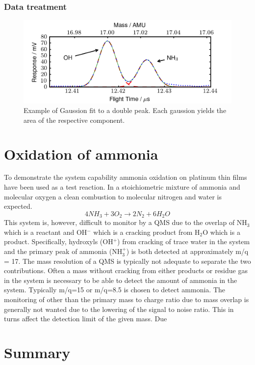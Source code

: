 \documentclass[aip,rsi]{revtex4-1}
\begin{document}
\subsubsection{Data treatment}
\begin{figure}
 \includegraphics[width=14cm]{ammonia_OH_gauss_fit.png}%
 \caption{Example of Gaussion fit to a double peak. Each gaussion yields the area of the respective component.\label{fig:gaussian_fit}}%
\end{figure}


\section{Oxidation of ammonia}
To demonstrate the system capability ammonia oxidation on platinum thin films have been used as a test reaction. In a stoichiometric mixture of ammonia and molecular oxygen a clean combustion to molecular nitrogen and water is expected.
\begin{equation}
4NH_3+3O_2\rightarrow 2N_2 + 6H_2O
\end{equation}
This system is, however, difficult to monitor by a QMS due to the overlap of NH$_3$ which is a reactant and OH$^-$ which is a cracking product from H$_2$O which is a product. Specifically, hydroxyls (OH$^{+}$) from cracking of trace water in the system and the primary peak of ammonia (NH$_{3}^{+}$) is both detected at approximately m/q = 17. The mass resolution of a QMS is typically not adequate to separate the two contributions. Often a mass without cracking from either products or residue gas in the system is necessary to be able to detect the amount of ammonia in the system. Typically m/q=15 or m/q=8.5 is chosen to detect ammonia. The monitoring of other than the primary mass to charge ratio due to mass overlap is generally not wanted due to the lowering of the signal to noise ratio. This in turns affect the detection limit of the given mass. Due   


\section{Summary}
\end{document}
